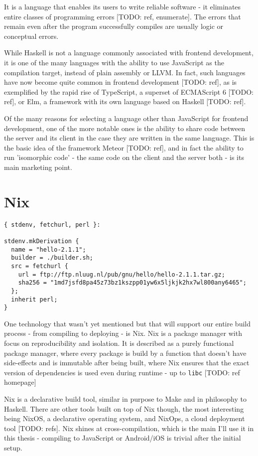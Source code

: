 \documentclass[english,odsaz]{fitthesis}
\begin{document}
It is a language that enables its users to write reliable software - it
eliminates entire classes of programming errors [TODO: ref, enumerate]. The
errors that remain even after the program successfully compiles are usually
logic or conceptual errors.

While Haskell is not a language commonly associated with frontend development,
it is one of the many languages with the ability to use JavaScript as the
compilation target, instead of plain assembly or LLVM. In fact, such languages
have now become quite common in frontend development [TODO: ref], as is
exemplified by the rapid rise of TypeScript, a superset of ECMAScript 6 [TODO:
ref], or Elm, a framework with its own language based on Haskell [TODO: ref].

Of the many reasons for selecting a language other than JavaScript for frontend
development, one of the more notable ones is the ability to share code between
the server and its client in the case they are written in the same
language. This is the basic idea of the framework Meteor [TODO: ref], and in
fact the ability to run 'isomorphic code' - the same code on the client and the
server both - is its main marketing point.

\section{Nix}
\label{sec:org2a41387}
\begin{verbatim}
{ stdenv, fetchurl, perl }:

stdenv.mkDerivation {
  name = "hello-2.1.1";
  builder = ./builder.sh;
  src = fetchurl {
    url = ftp://ftp.nluug.nl/pub/gnu/hello/hello-2.1.1.tar.gz;
    sha256 = "1md7jsfd8pa45z73bz1kszpp01yw6x5ljkjk2hx7wl800any6465";
  };
  inherit perl;
}
\end{verbatim}

One technology that wasn't yet mentioned but that will support our entire build
process - from compiling to deploying - is Nix. Nix is a package manager with
focus on reproducibility and isolation. It is described as a purely functional
package manager, where every package is build by a function that doesn't have
side-effects and is immutable after being built, where Nix ensures that the
exact version of dependencies is used even during runtime - up to \texttt{libc} [TODO:
ref homepage]

Nix is a declarative build tool, similar in purpose to Make and in philosophy to
Haskell. There are other tools built on top of Nix though, the most interesting
being NixOS, a declarative operating system, and NixOps, a cloud deployment tool
[TODO: refs]. Nix shines at cross-compilation, which is the main I'll use it in
this thesis - compiling to JavaScript or Android/iOS is trivial after the
initial setup.
\end{document}
